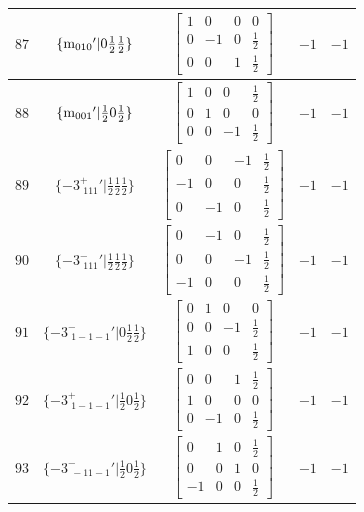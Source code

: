 \documentclass[fleqn,8pt]{jsarticle}
\begin{document}
\begin{longtable}{ccccc}
$ 87 $ & $ \{{\rm m}_{010}{}'|0 \frac{1}{2} \frac{1}{2}\} $ & $ \begin{bmatrix} 1 & 0 & 0 & 0 \\ 0 & -1 & 0 & \frac{1}{2} \\ 0 & 0 & 1 & \frac{1}{2} \end{bmatrix} $ & $ -1 $ & $ -1 $ \\ \hline
$ 88 $ & $ \{{\rm m}_{001}{}'|\frac{1}{2} 0 \frac{1}{2}\} $ & $ \begin{bmatrix} 1 & 0 & 0 & \frac{1}{2} \\ 0 & 1 & 0 & 0 \\ 0 & 0 & -1 & \frac{1}{2} \end{bmatrix} $ & $ -1 $ & $ -1 $ \\ \hline
$ 89 $ & $ \{-3^{+}_{\,\,111}{}'|\frac{1}{2} \frac{1}{2} \frac{1}{2}\} $ & $ \begin{bmatrix} 0 & 0 & -1 & \frac{1}{2} \\ -1 & 0 & 0 & \frac{1}{2} \\ 0 & -1 & 0 & \frac{1}{2} \end{bmatrix} $ & $ -1 $ & $ -1 $ \\ \hline
$ 90 $ & $ \{-3^{-}_{\,\,111}{}'|\frac{1}{2} \frac{1}{2} \frac{1}{2}\} $ & $ \begin{bmatrix} 0 & -1 & 0 & \frac{1}{2} \\ 0 & 0 & -1 & \frac{1}{2} \\ -1 & 0 & 0 & \frac{1}{2} \end{bmatrix} $ & $ -1 $ & $ -1 $ \\ \hline
$ 91 $ & $ \{-3^{-}_{\,\,1-1-1}{}'|0 \frac{1}{2} \frac{1}{2}\} $ & $ \begin{bmatrix} 0 & 1 & 0 & 0 \\ 0 & 0 & -1 & \frac{1}{2} \\ 1 & 0 & 0 & \frac{1}{2} \end{bmatrix} $ & $ -1 $ & $ -1 $ \\ \hline
$ 92 $ & $ \{-3^{+}_{\,\,1-1-1}{}'|\frac{1}{2} 0 \frac{1}{2}\} $ & $ \begin{bmatrix} 0 & 0 & 1 & \frac{1}{2} \\ 1 & 0 & 0 & 0 \\ 0 & -1 & 0 & \frac{1}{2} \end{bmatrix} $ & $ -1 $ & $ -1 $ \\ \hline
$ 93 $ & $ \{-3^{-}_{\,\,-11-1}{}'|\frac{1}{2} 0 \frac{1}{2}\} $ & $ \begin{bmatrix} 0 & 1 & 0 & \frac{1}{2} \\ 0 & 0 & 1 & 0 \\ -1 & 0 & 0 & \frac{1}{2} \end{bmatrix} $ & $ -1 $ & $ -1 $ \\ \hline

\end{longtable}
\end{document}
